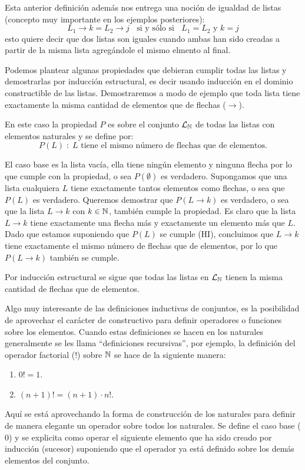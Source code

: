 \begin{ejemplo}
Esta anterior definición además nos entrega una noción de igualdad de listas (concepto muy importante en los ejemplos posteriores):
\[
L_1\rightarrow k = L_2\rightarrow j \;\;\text{ si y sólo si }\;\; L_1=L_2 \text{ y } k=j
\]
esto quiere decir que dos listas son iguales cuando ambas han sido creadas a partir de la misma lista agregándole el mismo elmento al final.

Podemos plantear algunas propiedades que debieran cumplir todas las listas y demostrarlas por inducción estructural, es decir usando inducción en el dominio constructible de las listas.
Demostraremos a modo de ejemplo que toda lista tiene exactamente la misma cantidad de elementos que de flechas ($\rightarrow$).

\begin{demostracion}
En este caso la propiedad $P$ es sobre el conjunto $\mathcal{L}_{\mathbb{N}}$ de todas las listas con elementos naturales y se define por:
\[
P(L)\;:\;L\text{ tiene el mismo número de flechas que de elementos.}
\]
\begin{inducciondemo}
\BI El caso base es la lista vacía, ella tiene ningún elemento y ninguna flecha por lo que cumple con la propiedad, o sea $P(\emptyset)$ es verdadero.
\HI Supongamos que una lista cualquiera $L$ tiene exactamente tantos elementos como flechas, o sea que $P(L)$ es verdadero.
\TI Queremos demostrar que $P(L\rightarrow k)$ es verdadero, o sea que la lista $L\rightarrow k$ con $k\in\mathbb{N}$, también cumple la propiedad.
Es claro que la lista $L\rightarrow k$ tiene exactamente una flecha más y exactamente un elemento más que $L$.
Dado que estamos suponiendo que $P(L)$ se cumple (HI), concluimos que $L\rightarrow k$ tiene exactamente el mismo número de flechas que de elementos, por lo que $P(L\rightarrow k)$ también se cumple.
\end{inducciondemo}
Por inducción estructural se sigue que todas las listas en $\mathcal{L}_{\mathbb{N}}$ tienen la misma cantidad de flechas que de elementos.
\end{demostracion}
\end{ejemplo}

Algo muy interesante de las definiciones inductivas de conjuntos, es la posibilidad de aprovechar el carácter de constructivo para definir operadores o funciones sobre los elementos.
Cuando estas definiciones se hacen en los naturales generalmente se les llama ``definiciones recursivas'', por ejemplo, la definición del operador factorial ($!$) sobre $\mathbb{N}$ se hace de la siguiente manera:
\begin{enumerate}
\itemsep 0pt
\item $0!=1$.
\item $(n+1)!=(n+1)\cdot n!$.
\end{enumerate}
Aquí se está aprovechando la forma de construcción de los naturales para definir de manera elegante un operador sobre todos los naturales.
Se define el caso base ($0$) y se explicita como operar el siguiente elemento que ha sido creado por inducción (sucesor) suponiendo que el operador ya está definido sobre los demás elementos del conjunto.

